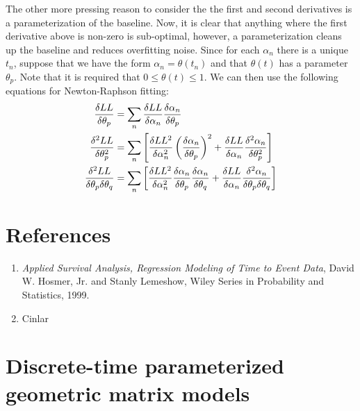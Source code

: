 \documentclass[10pt]{article}
\begin{document}
The other more pressing reason to consider the the first and second derivatives is a parameterization of the baseline.  Now, it is clear that anything where the 
first derivative above is non-zero is sub-optimal, however, a parameterization cleans up the baseline and reduces overfitting noise.
Since for each $\alpha_n$ there is a unique $t_n$, suppose that we have the form $\alpha_n=\theta(t_n)$ and that $\theta(t)$ has a parameter $\theta_p$. 
Note that it is required that $0 \le \theta(t) \le 1$. We can then
use the following equations for Newton-Raphson fitting:
\begin{align*}
{\delta LL \over \delta \theta_p}&=\sum_n {\delta LL \over \delta \alpha_n}{\delta \alpha_n\over \delta \theta_p}\\
{\delta^2 LL \over \delta \theta_p^2}&=\sum_n \left[{{\delta LL^2 \over \delta \alpha_n^2}\left({\delta \alpha_n\over \delta \theta_p}\right)^2
+{\delta LL \over \delta \alpha_n}{\delta^2 \alpha_n\over \delta \theta_p^2}
}\right]\\
{\delta^2 LL \over \delta \theta_p \delta \theta_q}&=\sum_n \left[{{\delta LL^2 \over \delta \alpha_n^2}{\delta \alpha_n\over \delta \theta_p}
{\delta \alpha_n\over \delta \theta_q}
+{\delta LL \over \delta \alpha_n}{\delta^2 \alpha_n\over \delta \theta_p \delta \theta_q}
}\right]
\end{align*}

\section{References}
\begin{enumerate}
\item {\em Applied Survival Analysis, Regression Modeling of Time to Event Data}, David W. Hosmer, Jr. and Stanly Lemeshow, Wiley Series in Probability and Statistics, 1999.

\item Cinlar
\end{enumerate}



\section{Discrete-time parameterized geometric matrix models}
\end{document}
